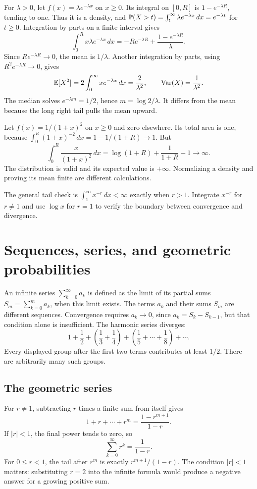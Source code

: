 \begin{example}
For $\lambda>0$, let $f(x)=\lambda e^{-\lambda x}$ on $x\ge0$.
Its integral on $[0,R]$ is $1-e^{-\lambda R}$, tending to one.
Thus it is a density, and
$\P(X>t)=\int_t^\infty\lambda e^{-\lambda x}\,dx=e^{-\lambda t}$
for $t\ge0$.
Integration by parts on a finite interval gives
\[
 \int_0^R x\lambda e^{-\lambda x}\,dx
 =-R e^{-\lambda R}+\frac{1-e^{-\lambda R}}{\lambda}.
\]
Since $R e^{-\lambda R}\to0$, the mean is $1/\lambda$.
Another integration by parts, using $R^2e^{-\lambda R}\to0$, gives
\[
 \E[X^2]=2\int_0^\infty xe^{-\lambda x}\,dx=\frac2{\lambda^2},
 \qquad \Var(X)=\frac1{\lambda^2}.
\]
The median solves $e^{-\lambda m}=1/2$, hence $m=\log2/\lambda$.
It differs from the mean because the long right tail pulls the mean upward.
\end{example}

\begin{example}
Let $f(x)=1/(1+x)^2$ on $x\ge0$ and zero elsewhere.
Its total area is one, because
$\int_0^R(1+x)^{-2}\,dx=1-1/(1+R)\to1$.
But
\[
 \int_0^R\frac{x}{(1+x)^2}\,dx
 =\log(1+R)+\frac1{1+R}-1\longrightarrow\infty.
\]
The distribution is valid and its expected value is $+\infty$.
Normalizing a density and proving its mean finite are different calculations.
\end{example}

The general tail check is
$\int_1^\infty x^{-r}\,dx<\infty$ exactly when $r>1$.
Integrate $x^{-r}$ for $r\ne1$ and use $\log x$ for $r=1$ to verify
the boundary between convergence and divergence.

\section{Sequences, series, and geometric probabilities}
\label{sec:calc-series}

An infinite series $\sum_{k=0}^{\infty}a_k$ is defined as the limit of
its partial sums $S_m=\sum_{k=0}^m a_k$, when this limit exists.
The terms $a_k$ and their sums $S_m$ are different sequences.
Convergence requires $a_k\to0$, since $a_k=S_k-S_{k-1}$, but that
condition alone is insufficient. The harmonic series diverges:
\[
 1+\frac12+\left(\frac13+\frac14\right)
 +\left(\frac15+\cdots+\frac18\right)+\cdots.
\]
Every displayed group after the first two terms contributes at least $1/2$.
There are arbitrarily many such groups.

\subsection*{The geometric series}
For $r\ne1$, subtracting $r$ times a finite sum from itself gives
\[
 1+r+\cdots+r^m=\frac{1-r^{m+1}}{1-r}.
\]
If $|r|<1$, the final power tends to zero, so
\[
 \sum_{k=0}^{\infty}r^k=\frac1{1-r}.
\]
For $0\le r<1$, the tail after $r^m$ is exactly $r^{m+1}/(1-r)$.
The condition $|r|<1$ matters: substituting $r=2$ into the infinite
formula would produce a negative answer for a growing positive sum.


